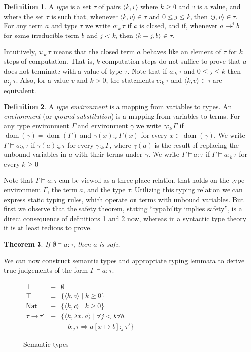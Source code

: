 \documentclass[10pt,a4paper,final,twocolumn]{article}
\theoremstyle{definition}
\newtheorem{definition}{Definition}
\theoremstyle{plain}
\newtheorem{theorem}[definition]{Theorem}
\newcommand{\abstr}[2]{\ensuremath{\lambda{#1}.\,{#2}}}
\newcommand{\Nat}{\ensuremath{\mathsf{Nat}}}
\newcommand{\pair}[1]{\ensuremath{\langle{#1}\rangle}}
\DeclareMathOperator{\dom}{dom}
\begin{document}
\begin{definition} \label{def:Type}
  A \emph{type} is a set $\tau$ of pairs $\pair{k,v}$ where $k \ge 0$ and $v$ is a value, and where the
  set $\tau$ is such that, whenever $\pair{k,v} \in \tau$ and $0 \le j \le k$, then $\pair{j,v} \in \tau$.
  For any term $a$ and type $\tau$ we write $a :_k \tau$ if $a$ is closed, and if, whenever $a \to^j b$ for some
  irreducible term $b$ and $j < k$, then $\pair{k-j,b} \in \tau$.
\end{definition}
Intuitively, $a :_k \tau$ means that the closed term $a$ behaves like an element of $\tau$ for $k$ steps
of computation. That is, $k$ computation steps do not suffice to prove that $a$ does not terminate with
a value of type $\tau$. Note that if $a :_k \tau$ and $0 \le j \le k$ then $a :_j \tau$. Also, for a value
$v$ and $k > 0$, the statements $v :_k \tau$ and $\pair{k,v} \in \tau$ are equivalent.
\begin{definition} \label{def:Typing}
  A \emph{type environment} is a mapping from variables to types. An \emph{environment}
  (or \emph{ground substitution}) is a mapping from variables to terms. For any type environment
  $\Gamma$ and environment $\gamma$ we write \mbox{$\gamma :_k \Gamma$} if \mbox{$\dom(\gamma) = \dom(\Gamma)$} and
  \mbox{$\gamma(x) :_k \Gamma(x)$} for every \mbox{$x \in \dom(\gamma)$}. We write \mbox{$\Gamma \models a :_k \tau$}
  if \mbox{$\gamma(a) :_k \tau$} for every \mbox{$\gamma :_k \Gamma$}, where $\gamma(a)$ is the result of replacing
  the unbound variables in $a$ with their terms under $\gamma$. We write \mbox{$\Gamma \models a : \tau$} if
  \mbox{$\Gamma \models a :_k \tau$} for every \mbox{$k \ge 0$}.
\end{definition}
Note that \mbox{$\Gamma \models a : \tau$} can be viewed as a three place relation that holds on the
type environment $\Gamma$, the term $a$, and the type $\tau$. Utilizing this typing relation
we can express static typing rules, which operate on terms with unbound variables. But first
we observe that the safety theorem, stating ``typability implies safety'', is a direct consequence
of definitions \ref{def:Type} and \ref{def:Typing} now, whereas in a syntactic type theory
it is at least tedious to prove.
\begin{theorem}
  If \mbox{$\emptyset \models a : \tau$}, then $a$ is safe.
\end{theorem}
We can now construct semantic types and appropriate typing lemmata to derive true judgements of the
form \mbox{$\Gamma \models a : \tau$}.
\begin{figure}[htb]
  \centering
  $\begin{array}{rcl}
    \bot &\equiv& \emptyset \\
    \top &\equiv& \{ \pair{k,v} \mid k \ge 0 \} \\
    \Nat &\equiv& \{ \pair{k,c} \mid k \ge 0 \} \\
    \tau \to \tau' &\equiv& \{ \pair{k,\abstr{x}{a}} \mid \forall j < k \forall b.\, \\
    && \quad b :_j \tau \Rightarrow a[x \mapsto b] :_j \tau' \}
    \end{array}$
  \caption{Semantic types}
  \label{fig:Semantic_types}
\end{figure}
\end{document}

